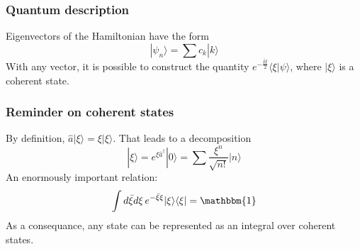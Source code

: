 \documentclass{beamer}
\begin{document}
\begin{frame}
    \frametitle{Quantum description}
    Eigenvectors of the Hamiltonian have the form
    \begin{equation*}
        |\psi_n\rangle = \sum c_k |k\rangle
    \end{equation*}
    With any vector, it is possible to construct the quantity 
    $e^{-\frac{\bar{\xi} \xi}{2}}\langle \xi | \psi \rangle$, where $|\xi \rangle$ is a coherent 
    state. 
\end{frame}

\begin{frame}
    \frametitle{Reminder on coherent states}
    By definition, 
    $ \hat{a}|\xi \rangle = \xi|\xi \rangle $.
    That leads to a decomposition
    \begin{equation*}
        |\xi \rangle = e^{\xi \hat{a}^\dagger}|0\rangle = \sum \frac{\xi^n}{\sqrt{n!}} |n\rangle
    \end{equation*}
    An enormously important relation:
    \begin{equation*}
        \int d\bar{\xi} d\xi\, e^{-\bar{\xi}\xi} |\xi\rangle\langle\xi | = \mathbbm{1}
    \end{equation*}
    As a consequance, any state can be represented as an integral over coherent states.     
    
\end{frame}
\end{document}
